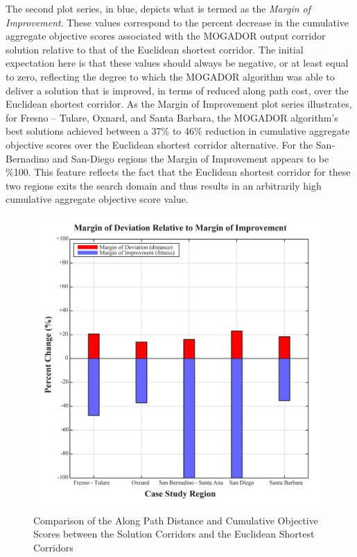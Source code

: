 The second plot series, in blue, depicts what is termed as the \textit{Margin of Improvement}. These values correspond to the percent decrease in the cumulative aggregate objective scores associated with the MOGADOR output corridor solution relative to that of the Euclidean shortest corridor. The initial expectation here is that these values should always be negative, or at least equal to zero, reflecting the degree to which the MOGADOR algorithm was able to deliver a solution that is improved, in terms of reduced along path cost, over the Euclidean shortest corridor. As the Margin of Improvement plot series illustrates, for Fresno -- Tulare, Oxnard, and Santa Barbara, the MOGADOR algorithm's best solutions achieved between a 37\% to 46\% reduction in cumulative aggregate objective scores over the Euclidean shortest corridor alternative. For the San-Bernadino and San-Diego regions the Margin of Improvement appears to be \%100. This feature reflects the fact that the Euclidean shortest corridor for these two regions exits the search domain and thus results in an arbitrarily high cumulative aggregate objective score value.

    \begin{figure}[!h]
        \begin{center}
        \includegraphics[width=5.5in]{figures/Margin_Improvement.png}
        \caption{Comparison of the Along Path Distance and Cumulative Objective Scores between the Solution Corridors and the Euclidean Shortest Corridors}
        \label{fig:MarginImprovement}
        \end{center}
    \end{figure}
    
